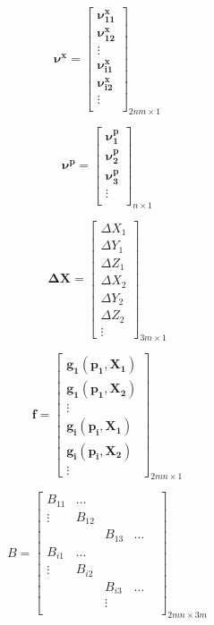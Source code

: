 \documentclass[]{article}
\begin{document}
\begin{equation*}
\pmb{\nu^x} = 
\begin{bmatrix}
\pmb{\nu_{11}^x} \\
\pmb{\nu_{12}^x} \\
\vdots \\
\pmb{\nu_{i1}^x} \\
\pmb{\nu_{i2}^x} \\
\vdots \\
\end{bmatrix}_{2nm \times 1}
\end{equation*}

\begin{equation*}
\pmb{\nu^p} = 
\begin{bmatrix}
\pmb{\nu_1^p} \\
\pmb{\nu_2^p} \\
\pmb{\nu_3^p} \\
\vdots \\
\end{bmatrix}_{n \times 1}
\end{equation*}

\begin{equation*}
\pmb{\Delta X} =
\begin{bmatrix}
\Delta X_1 \\
\Delta Y_1 \\
\Delta Z_1 \\
\Delta X_2 \\
\Delta Y_2 \\
\Delta Z_2 \\
\vdots
\end{bmatrix}_{3m \times 1}
\end{equation*}

\begin{equation*}
\pmb{f} = 
\begin{bmatrix}
\pmb{g_1}(\pmb{p_1}, \pmb{X_1}) \\
\pmb{g_1}(\pmb{p_1}, \pmb{X_2}) \\
\vdots\\
\pmb{g_i}(\pmb{p_i}, \pmb{X_1}) \\
\pmb{g_i}(\pmb{p_i}, \pmb{X_2}) \\
\vdots
\end{bmatrix}_{2mn \times 1}
\end{equation*}

\begin{equation*}
B = 
\begin{bmatrix}
B_{11}  &  \ldots      &     &     & \\
\vdots  &  B_{12} \\
  &     &          B_{13} & \ldots \\
B_{i1}  &  \ldots \\
\vdots  &  B_{i2} \\
  &     &  B_{i3}  & \ldots \\ 
  &     &  \vdots \\
\end{bmatrix}_{2mn \times 3m}
\end{equation*}
\end{document}
